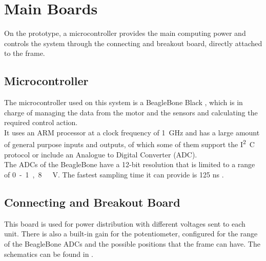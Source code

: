 \section{Main Boards}
On the prototype, a microcontroller provides the main computing power and controls the system through the connecting and breakout board, directly attached to the frame.

\subsection{Microcontroller}
The microcontroller used on this system is a BeagleBone Black \cite{BeagleBone}, which is in charge of managing the data from the motor and the sensors and calculating the required control action.\\
It uses an ARM processor at a clock frequency of \SI{1}{GHz} and has a large amount of general purpose inputs and outputs, of which some of them support the \si{I^2C} protocol or include an Analogue to Digital Converter (ADC).\\
The ADCs of the BeagleBone have a 12-bit resolution that is limited to a range of \si{0 - 1,8\ V}. The fastest sampling time it can provide is \si{125} \si{ns} \cite{Cameon}.

\subsection{Connecting and Breakout Board}
This board is used for power distribution with different voltages sent to each unit. There is also a built-in gain for the potentiometer, configured for the range of the BeagleBone ADCs and the possible positions that the frame can have. The schematics can be found in .

